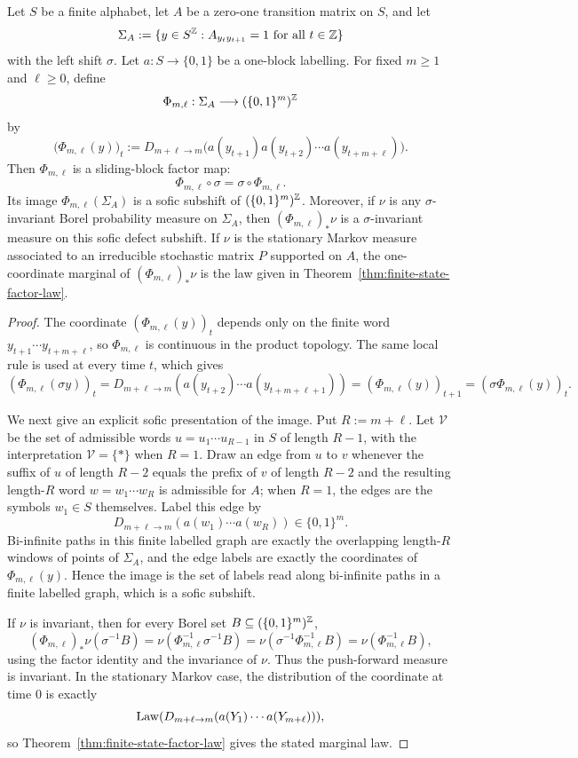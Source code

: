 \begin{proposition}
\label{prop:sofic-defect-factor}
Let $S$ be a finite alphabet, let $A$ be a zero-one transition matrix on $S$,
and let
\[
\Sigma_A:=\{y\in S^{\mathbb{Z}}: A_{y_t y_{t+1}}=1\text{ for all }t\in\mathbb{Z}\}
\]
with the left shift $\sigma$.  Let $a:S\to\{0,1\}$ be a one-block labelling.
For fixed $m\ge 1$ and $\ell\ge 0$, define
\[
\Phi_{m,\ell}:\Sigma_A\longrightarrow (\{0,1\}^m)^{\mathbb{Z}}
\]
by
\[
\bigl(\Phi_{m,\ell}(y)\bigr)_t
:=
D_{m+\ell\to m}
\bigl(a(y_{t+1})a(y_{t+2})\cdots a(y_{t+m+\ell})\bigr).
\]
Then $\Phi_{m,\ell}$ is a sliding-block factor map:
\[
\Phi_{m,\ell}\circ\sigma=\sigma\circ\Phi_{m,\ell}.
\]
Its image $\Phi_{m,\ell}(\Sigma_A)$ is a sofic subshift of
$(\{0,1\}^m)^{\mathbb{Z}}$.  Moreover, if $\nu$ is any $\sigma$-invariant Borel
probability measure on $\Sigma_A$, then $(\Phi_{m,\ell})_\ast\nu$ is a
$\sigma$-invariant measure on this sofic defect subshift.  If $\nu$ is the
stationary Markov measure associated to an irreducible stochastic matrix $P$
supported on $A$, the one-coordinate marginal of $(\Phi_{m,\ell})_\ast\nu$ is
the law given in Theorem~\ref{thm:finite-state-factor-law}.
\end{proposition}

\begin{proof}
The coordinate $(\Phi_{m,\ell}(y))_t$ depends only on the finite word
$y_{t+1}\cdots y_{t+m+\ell}$, so $\Phi_{m,\ell}$ is continuous in the product
topology.  The same local rule is used at every time $t$, which gives
\[
(\Phi_{m,\ell}(\sigma y))_t
=D_{m+\ell\to m}(a(y_{t+2})\cdots a(y_{t+m+\ell+1}))
=(\Phi_{m,\ell}(y))_{t+1}
=(\sigma\Phi_{m,\ell}(y))_t.
\]

We next give an explicit sofic presentation of the image.  Put $R:=m+\ell$.
Let $\mathcal V$ be the set of admissible words $u=u_1\cdots u_{R-1}$ in $S$ of
length $R-1$, with the interpretation $\mathcal V=\{\ast\}$ when $R=1$.  Draw an
edge from $u$ to $v$ whenever the suffix of $u$ of length $R-2$ equals the
prefix of $v$ of length $R-2$ and the resulting length-$R$ word
$w=w_1\cdots w_R$ is admissible for $A$; when $R=1$, the edges are the symbols
$w_1\in S$ themselves.  Label this edge by
\[
D_{m+\ell\to m}(a(w_1)\cdots a(w_R))\in\{0,1\}^m.
\]
Bi-infinite paths in this finite labelled graph are exactly the overlapping
length-$R$ windows of points of $\Sigma_A$, and the edge labels are exactly the
coordinates of $\Phi_{m,\ell}(y)$.  Hence the image is the set of labels read
along bi-infinite paths in a finite labelled graph, which is a sofic subshift.

If $\nu$ is invariant, then for every Borel set $B\subseteq(\{0,1\}^m)^{\mathbb{Z}}$,
\[
(\Phi_{m,\ell})_\ast\nu(\sigma^{-1}B)
=\nu(\Phi_{m,\ell}^{-1}\sigma^{-1}B)
=\nu(\sigma^{-1}\Phi_{m,\ell}^{-1}B)
=\nu(\Phi_{m,\ell}^{-1}B),
\]
using the factor identity and the invariance of $\nu$.  Thus the push-forward
measure is invariant.  In the stationary Markov case, the distribution of the
coordinate at time $0$ is exactly
\[
\operatorname{Law}(D_{m+\ell\to m}(a(Y_1)\cdots a(Y_{m+\ell}))),
\]
so Theorem~\ref{thm:finite-state-factor-law} gives the stated marginal law.
\end{proof}

